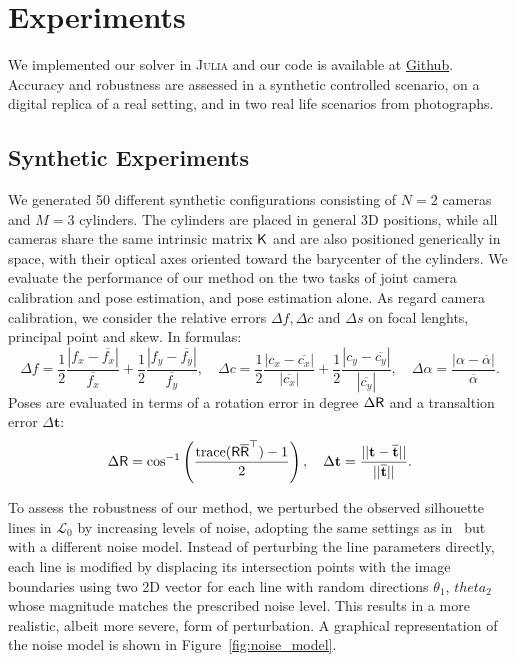 \section{Experiments}
\label{sec:experiments}
We implemented our solver in \textsc{Julia} and our code is available at \href{https://github.com/EnricoBarbieri1997/cylinder-based-homotopy-camera-calibration}{Github}. Accuracy and robustness are assessed in a synthetic controlled scenario, on a digital replica of a real setting, and in two real life scenarios from photographs.

\subsection{Synthetic Experiments}

We generated 50 different synthetic configurations consisting of $N = 2$ cameras and $M = 3$ cylinders. The cylinders are placed in general 3D positions, while all cameras share the same intrinsic matrix $\mathsf{K}$ and are also positioned generically in space, with their optical axes oriented toward the barycenter of the cylinders.
We evaluate the performance of our method on the two tasks of joint camera calibration and pose estimation, and pose estimation alone.
As regard camera calibration, we consider the relative errors $\Delta f, \Delta c$ and $\Delta s$ on focal lenghts, principal point and skew. In formulas:
\begin{equation}
\Delta f = \frac{1}{2}\frac{|f_x-\overline{f_x}|}{\overline{f_x}}+\frac{1}{2}\frac{|f_y-\overline{f_y}|}{\overline{f_y}},\quad 
\Delta c = \frac{1}{2}\frac{|c_x-\overline{c_x}|}{|\overline{c_x}|}+\frac{1}{2}\frac{|c_y-\overline{c_y}|}{|\overline{c_y}|}, \quad
 \Delta \alpha = \frac{|\alpha-\overline{\alpha}|}{\overline{\alpha}}.
 \label{eq:calibration_errors}
\end{equation}
Poses are evaluated in terms of a rotation error in degree $\Delta \mathsf{R}$ and a transaltion error $\Delta \mathbf{t}$:
\begin{equation}
 \Delta \mathsf{R} = \cos^{-1}\left(\frac{\mathrm{trace}(\mathsf{R} \overline{\mathsf{R}}^\top) - 1}{2} \right),\quad
  \Delta \mathbf{t} = \frac{||\mathbf{t}-\overline{\mathbf{t}}||}{||\overline{\mathbf{t}}||}.
    \label{eq:pose_errors}
\end{equation}

To assess the robustness of our method, we perturbed the observed silhouette lines in $\mathcal{L}_0$ by increasing levels of noise, adopting the same settings as in~\cite{gummeson22pose} but with a different noise model. Instead of perturbing the line parameters directly, each line is modified by displacing its intersection points with the image boundaries using two 2D vector for each line with random directions $\theta_1$, $theta_2$ whose magnitude matches the prescribed noise level. This results in a more realistic, albeit more severe, form of perturbation. A graphical representation of the noise model is shown in Figure~\ref{fig:noise_model}.

